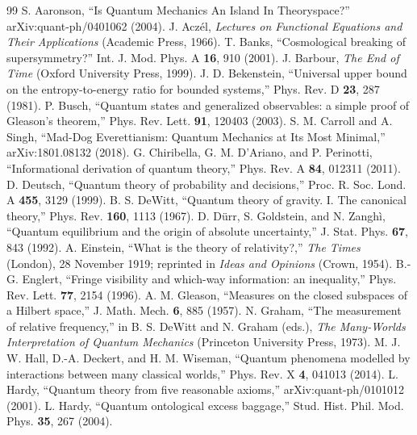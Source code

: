\documentclass[11pt]{article}
\theoremstyle{definition}
\theoremstyle{remark}
\begin{document}
\begin{thebibliography}{99}\small
{} S. Aaronson, ``Is Quantum Mechanics An Island In Theoryspace?'' arXiv:quant-ph/0401062 (2004).
 J. Acz\'el, \emph{Lectures on Functional Equations and Their Applications} (Academic Press, 1966).
 T. Banks, ``Cosmological breaking of supersymmetry?'' Int. J. Mod. Phys. A \textbf{16}, 910 (2001).
 J. Barbour, \emph{The End of Time} (Oxford University Press, 1999).
 J. D. Bekenstein, ``Universal upper bound on the entropy-to-energy ratio for bounded systems,'' Phys. Rev. D \textbf{23}, 287 (1981).
 P. Busch, ``Quantum states and generalized observables: a simple proof of Gleason's theorem,'' Phys. Rev. Lett. \textbf{91}, 120403 (2003).
 S. M. Carroll and A. Singh, ``Mad-Dog Everettianism: Quantum Mechanics at Its Most Minimal,'' arXiv:1801.08132 (2018).
 G. Chiribella, G. M. D'Ariano, and P. Perinotti, ``Informational derivation of quantum theory,'' Phys. Rev. A \textbf{84}, 012311 (2011).
 D. Deutsch, ``Quantum theory of probability and decisions,'' Proc. R. Soc. Lond. A \textbf{455}, 3129 (1999).
 B. S. DeWitt, ``Quantum theory of gravity. I. The canonical theory,'' Phys. Rev. \textbf{160}, 1113 (1967).
 D. D\"urr, S. Goldstein, and N. Zangh\`i, ``Quantum equilibrium and the origin of absolute uncertainty,'' J. Stat. Phys. \textbf{67}, 843 (1992).
 A. Einstein, ``What is the theory of relativity?,'' \emph{The Times} (London), 28 November 1919; reprinted in \emph{Ideas and Opinions} (Crown, 1954).
 B.-G. Englert, ``Fringe visibility and which-way information: an inequality,'' Phys. Rev. Lett. \textbf{77}, 2154 (1996).
 A. M. Gleason, ``Measures on the closed subspaces of a Hilbert space,'' J. Math. Mech. \textbf{6}, 885 (1957).
 N. Graham, ``The measurement of relative frequency,'' in B. S. DeWitt and N. Graham (eds.), \emph{The Many-Worlds Interpretation of Quantum Mechanics} (Princeton University Press, 1973).
 M. J. W. Hall, D.-A. Deckert, and H. M. Wiseman, ``Quantum phenomena modelled by interactions between many classical worlds,'' Phys. Rev. X \textbf{4}, 041013 (2014).
 L. Hardy, ``Quantum theory from five reasonable axioms,'' arXiv:quant-ph/0101012 (2001).
 L. Hardy, ``Quantum ontological excess baggage,'' Stud. Hist. Phil. Mod. Phys. \textbf{35}, 267 (2004).

\end{thebibliography}
\end{document}
